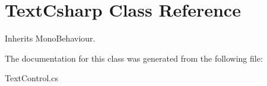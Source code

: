 \hypertarget{class_text_csharp}{\section{Text\+Csharp Class Reference}
\label{class_text_csharp}
}


Inherits Mono\+Behaviour.



The documentation for this class was generated from the following file\+:\begin{DoxyCompactItemize}
\item 
Text\+Control.\+cs\end{DoxyCompactItemize}

